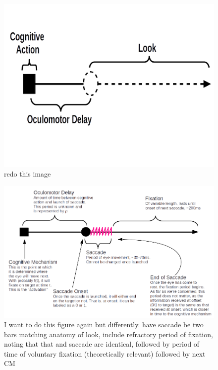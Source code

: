 \documentclass{article}
\begin{document}
\begin{figure}[H]
\centering
\includegraphics[scale=0.25]{om_delay2.png}
\caption{redo this image}
\label{fig:sac_fix_look_om}
\end{figure}


\begin{figure}
\centering
\includegraphics[scale=0.5]{labeled_full_diagram.png}
\caption{I want to do this figure again but differently. have saccade be  two bars matching anatomy of look, include refractory period of fixation, noting that that and saccade are identical, followed by period of time of voluntary fixation (theoretically relevant) followed by next CM}
\label{fig:full_diagram_looks}
\end{figure}
\end{document}
